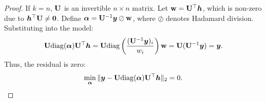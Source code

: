 \documentclass{article} %
\def\valpha{{\bm\alpha}}
\begin{document}
\begin{proof}
		If $k = n$, ${\mathbf{U}}$ is an invertible $n \times n$ matrix.
		Let $\mathbf{w} = {\mathbf{U}}^\top {\bm{h}}$, which is non-zero due to ${\bm{h}}^\top {\mathbf{U}} \neq \mathbf{0}$.
		Define $\valpha = \rmU^{-1} \vy \oslash \mathbf{w}$, where $\oslash$ denotes Hadamard division. Substituting into the model:
		\begin{equation}
			\begin{aligned}
				\rmU \mathrm{diag}(\valpha) \rmU^\top \vh = \rmU \mathrm{diag}\left( \frac{(\rmU^{-1} \vy)_i}{w_i} \right) \mathbf{w} = \rmU (\rmU^{-1} \vy) = \vy.
			\end{aligned}
		\end{equation}
		Thus, the residual is zero:
		\begin{equation}
			\begin{aligned}
				\min_{\valpha} \| \vy - \rmU \mathrm{diag}(\valpha) \rmU^\top \vh \|_2 = 0.
			\end{aligned}
		\end{equation}
	\end{proof}
	
	
\end{document}
